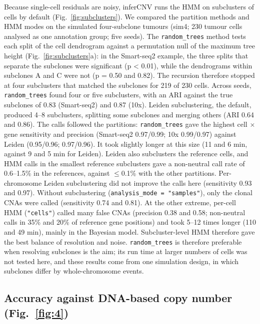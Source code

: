Because single-cell residuals are noisy, inferCNV runs the HMM on subclusters of cells by default (Fig.~\ref{fig:subclusters}). We compared the partition methods and HMM modes on the simulated four-subclone tumours (sim4; 230 tumour cells analysed as one annotation group; five seeds). The \texttt{random\_trees} method tests each split of the cell dendrogram against a permutation null of the maximum tree height (Fig.~\ref{fig:subclusters}a): in the Smart-seq2 example, the three splits that separate the subclones were significant (p < 0.01), while the dendrograms within subclones A and C were not (p = 0.50 and 0.82). The recursion therefore stopped at four subclusters that matched the subclones for 219 of 230 cells. Across seeds, \texttt{random\_trees} found four or five subclusters, with an ARI against the true subclones of 0.83 (Smart-seq2) and 0.87 (10x). Leiden subclustering, the default, produced 4--8 subclusters, splitting some subclones and merging others (ARI 0.64 and 0.86). The calls followed the partitions: \texttt{random\_trees} gave the highest cell $\times$ gene sensitivity and precision (Smart-seq2 0.97/0.99; 10x 0.99/0.97) against Leiden (0.95/0.96; 0.97/0.96). It took slightly longer at this size (11 and 6 min, against 9 and 5 min for Leiden). Leiden also subclusters the reference cells, and HMM calls in the smallest reference subclusters gave a non-neutral call rate of 0.6--1.5\% in the references, against $\leq$0.1\% with the other partitions. Per-chromosome Leiden subclustering did not improve the calls here (sensitivity 0.93 and 0.97). Without subclustering (\texttt{analysis\_mode = "samples"}), only the clonal CNAs were called (sensitivity 0.74 and 0.81). At the other extreme, per-cell HMM (\texttt{"cells"}) called many false CNAs (precision 0.38 and 0.58; non-neutral calls in 35\% and 20\% of reference gene positions) and took 5--12 times longer (110 and 49 min), mainly in the Bayesian model. Subcluster-level HMM therefore gave the best balance of resolution and noise. \texttt{random\_trees} is therefore preferable when resolving subclones is the aim; its run time at larger numbers of cells was not tested here, and these results come from one simulation design, in which subclones differ by whole-chromosome events.


\subsection{Accuracy against DNA-based copy number (Fig.~\ref{fig:4})}

